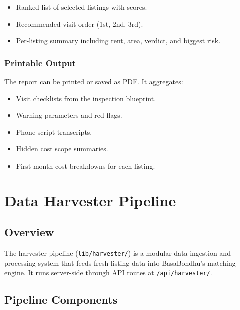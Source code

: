 \documentclass[12pt, a4paper, oneside]{report}
\newcommand{\filepath}[1]{\texttt{\small\color{codeblue}#1}}
\newcommand{\apiendpoint}[1]{\texttt{\small\color{primary}#1}}
\begin{document}
\begin{itemize}[leftmargin=2em]
  \item Ranked list of selected listings with scores.
  \item Recommended visit order (1st, 2nd, 3rd).
  \item Per-listing summary including rent, area, verdict, and biggest risk.
\end{itemize}

\subsection{Printable Output}

The report can be printed or saved as PDF. It aggregates:

\begin{itemize}[leftmargin=2em]
  \item Visit checklists from the inspection blueprint.
  \item Warning parameters and red flags.
  \item Phone script transcripts.
  \item Hidden cost scope summaries.
  \item First-month cost breakdowns for each listing.
\end{itemize}


\chapter{Data Harvester Pipeline}

\section{Overview}

The harvester pipeline (\filepath{lib/harvester/}) is a modular data ingestion and processing system that feeds fresh listing data into BasaBondhu's matching engine. It runs server-side through API routes at \apiendpoint{/api/harvester/}.

\section{Pipeline Components}
\end{document}
